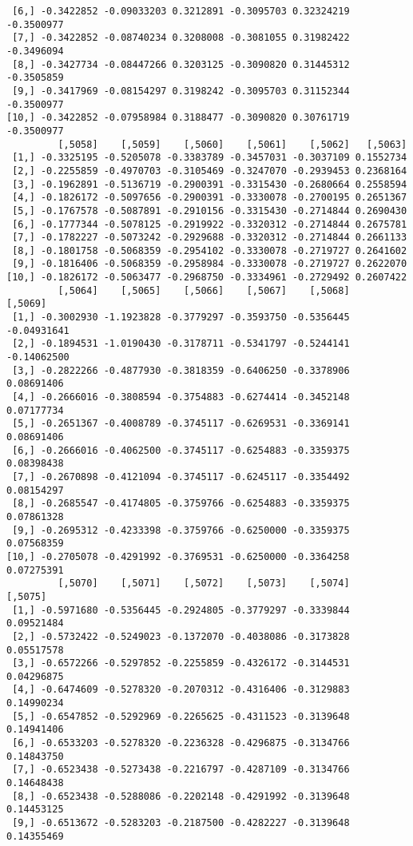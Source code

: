 \documentclass[
  letterpaper,
  DIV=11,
  numbers=noendperiod]{scrreprt}
\begin{document}
\begin{verbatim}
 [6,] -0.3422852 -0.09033203 0.3212891 -0.3095703 0.32324219 -0.3500977
 [7,] -0.3422852 -0.08740234 0.3208008 -0.3081055 0.31982422 -0.3496094
 [8,] -0.3427734 -0.08447266 0.3203125 -0.3090820 0.31445312 -0.3505859
 [9,] -0.3417969 -0.08154297 0.3198242 -0.3095703 0.31152344 -0.3500977
[10,] -0.3422852 -0.07958984 0.3188477 -0.3090820 0.30761719 -0.3500977
         [,5058]    [,5059]    [,5060]    [,5061]    [,5062]   [,5063]
 [1,] -0.3325195 -0.5205078 -0.3383789 -0.3457031 -0.3037109 0.1552734
 [2,] -0.2255859 -0.4970703 -0.3105469 -0.3247070 -0.2939453 0.2368164
 [3,] -0.1962891 -0.5136719 -0.2900391 -0.3315430 -0.2680664 0.2558594
 [4,] -0.1826172 -0.5097656 -0.2900391 -0.3330078 -0.2700195 0.2651367
 [5,] -0.1767578 -0.5087891 -0.2910156 -0.3315430 -0.2714844 0.2690430
 [6,] -0.1777344 -0.5078125 -0.2919922 -0.3320312 -0.2714844 0.2675781
 [7,] -0.1782227 -0.5073242 -0.2929688 -0.3320312 -0.2714844 0.2661133
 [8,] -0.1801758 -0.5068359 -0.2954102 -0.3330078 -0.2719727 0.2641602
 [9,] -0.1816406 -0.5068359 -0.2958984 -0.3330078 -0.2719727 0.2622070
[10,] -0.1826172 -0.5063477 -0.2968750 -0.3334961 -0.2729492 0.2607422
         [,5064]    [,5065]    [,5066]    [,5067]    [,5068]     [,5069]
 [1,] -0.3002930 -1.1923828 -0.3779297 -0.3593750 -0.5356445 -0.04931641
 [2,] -0.1894531 -1.0190430 -0.3178711 -0.5341797 -0.5244141 -0.14062500
 [3,] -0.2822266 -0.4877930 -0.3818359 -0.6406250 -0.3378906  0.08691406
 [4,] -0.2666016 -0.3808594 -0.3754883 -0.6274414 -0.3452148  0.07177734
 [5,] -0.2651367 -0.4008789 -0.3745117 -0.6269531 -0.3369141  0.08691406
 [6,] -0.2666016 -0.4062500 -0.3745117 -0.6254883 -0.3359375  0.08398438
 [7,] -0.2670898 -0.4121094 -0.3745117 -0.6245117 -0.3354492  0.08154297
 [8,] -0.2685547 -0.4174805 -0.3759766 -0.6254883 -0.3359375  0.07861328
 [9,] -0.2695312 -0.4233398 -0.3759766 -0.6250000 -0.3359375  0.07568359
[10,] -0.2705078 -0.4291992 -0.3769531 -0.6250000 -0.3364258  0.07275391
         [,5070]    [,5071]    [,5072]    [,5073]    [,5074]    [,5075]
 [1,] -0.5971680 -0.5356445 -0.2924805 -0.3779297 -0.3339844 0.09521484
 [2,] -0.5732422 -0.5249023 -0.1372070 -0.4038086 -0.3173828 0.05517578
 [3,] -0.6572266 -0.5297852 -0.2255859 -0.4326172 -0.3144531 0.04296875
 [4,] -0.6474609 -0.5278320 -0.2070312 -0.4316406 -0.3129883 0.14990234
 [5,] -0.6547852 -0.5292969 -0.2265625 -0.4311523 -0.3139648 0.14941406
 [6,] -0.6533203 -0.5278320 -0.2236328 -0.4296875 -0.3134766 0.14843750
 [7,] -0.6523438 -0.5273438 -0.2216797 -0.4287109 -0.3134766 0.14648438
 [8,] -0.6523438 -0.5288086 -0.2202148 -0.4291992 -0.3139648 0.14453125
 [9,] -0.6513672 -0.5283203 -0.2187500 -0.4282227 -0.3139648 0.14355469

\end{verbatim}
\end{document}
